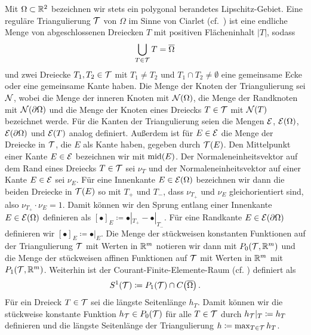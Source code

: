 Mit $\Omega\subset\mathbb{R}^2$ bezeichnen wir stets ein polygonal berandetes
Lipschitz-Gebiet. 
Eine reguläre Triangulierung $\mathcal{T}$ von $\Omega$ im Sinne von Ciarlet (cf.\
\cites[34]{Car09b}[345]{CGR12}[8]{CGKNRR10}) ist eine endliche Menge von
abgeschlossenen Dreiecken $T$ mit positiven Flächeninhalt $|T|$, sodass
\begin{align*}
  \bigcup_{T\in\mathcal{T}} T=\overline{\Omega}
\end{align*}
und zwei Dreiecke $T_1,T_2\in\mathcal{T}$ mit $T_1\neq T_2$ und $T_1\cap
T_2\neq\emptyset$ eine gemeinsame Ecke oder eine gemeinsame Kante haben.
Die Menge der Knoten der Triangulierung sei $\mathcal{N}$, wobei die Menge der
inneren Knoten mit $\mathcal{N}(\Omega)$, die Menge der Randknoten mit
$\mathcal{N}(\partial\Omega)$ und die Menge der Knoten eines Dreiecks $T\in\mathcal{T}$ mit
$\mathcal{N}(T)$ bezeichnet werde. 
Für die Kanten der Triangulierung seien die Mengen $\mathcal{E}$, $\mathcal{E}(\Omega)$,
$\mathcal{E}(\partial\Omega)$ und $\mathcal{E}(T)$ analog definiert. 
Außerdem ist für $E\in\mathcal{E}$ die Menge der Dreiecke in $\mathcal{T}$, die $E$
als Kante haben, gegeben durch $\mathcal{T}(E)$. 
Den Mittelpunkt einer Kante $E\in\mathcal{E}$ bezeichnen wir mit $\textup{mid}(E)$.
Der Normaleneinheitsvektor auf dem Rand eines Dreiecks $T\in\mathcal{T}$ sei
$\nu_T$ und der Normaleneinheitsvektor auf einer Kante $E\in\mathcal{E}$ sei
$\nu_E$. 
Für eine Innenkante $E\in\mathcal{E}(\Omega)$ bezeichnen wir dann die beiden
Dreiecke in $\mathcal{T}(E)$  so mit $T_+$ und $T_-$, dass
$\nu_{T_+}$ und $\nu_E$ gleichorientiert sind, also $\nu_{T_+}\cdot\nu_E=1$.
Damit können wir den Sprung entlang einer Innenkante $E\in\mathcal{E}(\Omega)$
definieren als $[\bullet]_E\coloneqq \bullet|_{T_+} -\bullet|_{T_-}$.
Für eine Randkante $E\in\mathcal{E}(\partial\Omega)$ definieren wir
$[\bullet]_E\coloneqq \bullet|_E$.
Die Menge der stückweisen konstanten Funktionen auf der Triangulierung $\mathcal{T}$
mit Werten in $\mathbb{R}^m$ notieren wir dann mit $ P_0\!\left(\mathcal{T},\mathbb{R}^m\right)$
und die Menge der stückweisen affinen Funktionen auf $\mathcal{T}$ mit Werten in
$\mathbb{R}^m$ mit $ P_1\!\left(\mathcal{T},\mathbb{R}^m\right)$. 
Weiterhin ist der Courant-Finite-Elemente-Raum (cf. \cite[12]{CGKNRR10})
definiert als
\begin{align*}
  S^1(\mathcal{T})\coloneqq P_1(\mathcal{T})\cap C\!\left(\overline{\Omega}\right).
\end{align*}
Für ein Dreieck $T\in\mathcal{T}$ sei die längste Seitenlänge $h_T$. 
Damit können wir die stückweise konstante Funktion $h_{\mathcal{T}}\in P_0(\mathcal{T})$
für alle $T\in\mathcal{T}$ durch $h_{\mathcal{T}}|_T\coloneqq h_T$ definieren und die längste
Seitenlänge der Triangulierung $h\coloneqq\max_{T\in\mathcal{T}}h_T$.

